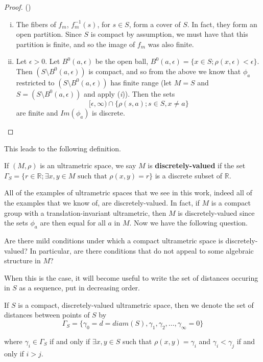 \begin{proof}
(\cite{ar}) 
\begin{enumerate}[(i)]
\item The fibers of $f_m$, $f_m^{-1}(s)$, for $s \in S$, form a cover of $S$. In fact, they form an open partition. Since $S$ is compact by assumption, we must have that this partition is finite, and so the image of $f_m$ was also finite.
\item Let $\epsilon >0$. Let $B^0(a,\epsilon)$ be the open ball, $B^0(a,\epsilon)= \{x \in S; \rho(x,\epsilon) < \epsilon\}$. Then $(S\setminus B^0(a,\epsilon))$ is compact, and so from the above we know that $\phi_{a}$ restricted to $(S\setminus B^0(a,\epsilon))$ has finite range (let $M = S$ and $S = (S\setminus B^0(a, \epsilon))$ and apply (\textit{i})). Then the sets \[ [\epsilon, \infty) \cap \{\rho(s,a); s \in S, x \neq a\} \] are finite and $Im(\phi_a)$ is discrete.
\end{enumerate}
\end{proof}

This leads to the following definition.\\

\begin{definition}
If $(M, \rho)$ is an ultrametric space, we say $M$ is \textbf{discretely-valued} if the set $\Gamma_S = \{r \in \mathbb{R}; \exists x,y \in M \text{ such that } \rho(x,y)=r\}$ is a discrete subset of $\mathbb{R}$.
\end{definition}

All of the examples of ultrametric spaces that we see in this work, indeed all of the examples that we know of, are discretely-valued. In fact, if $M$ is a compact group with  a translation-invariant ultrametric, then $M$ is discretely-valued since the sets $\phi_a$ are then equal for all $a$ in $M$. Now we have the following question.\\

\begin{question}
	Are there mild conditions under which a compact ultrametric space is discretely-valued? In particular, are there conditions that do not appeal to some algebraic structure in $M$?
\end{question}

When this is the case, it will become useful to write the set of distances occuring in $S$ as a sequence, put in decreasing order.\\

\begin{notation*}
	If $S$ is a compact, discretely-valued ultrametric space, then we denote the set of distances between points of $S$ by 
	$$\Gamma_S = \{\gamma_0 = d =diam(S), \gamma_1, \gamma_2, \ldots, \gamma_\infty =0 \}$$
	
	where $\gamma_i \in  \Gamma_S$ if and only if $\exists x,y \in S$ such that $\rho(x,y) = \gamma_i$ and  $\gamma_i < \gamma_j$ if and only if $i > j$. 
\end{notation*}


